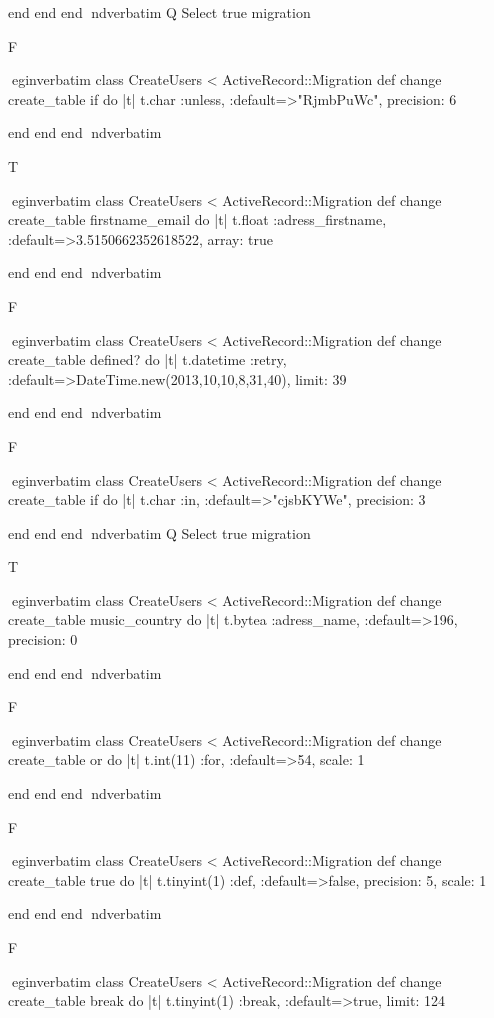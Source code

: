     end 
  end 
end
nd{verbatim}
Q
 Select true migration

F

egin{verbatim}
 class CreateUsers < ActiveRecord::Migration 
  def change 
    create_table if do |t| 
      t.char :unless, :default=>"RjmbPuWc", precision: 6
    
    end 
  end 
end
nd{verbatim}

T

egin{verbatim}
 class CreateUsers < ActiveRecord::Migration 
  def change 
    create_table firstname_email do |t| 
      t.float :adress_firstname, :default=>3.5150662352618522, array: true
    
    end 
  end 
end
nd{verbatim}

F

egin{verbatim}
 class CreateUsers < ActiveRecord::Migration 
  def change 
    create_table defined? do |t| 
      t.datetime :retry, :default=>DateTime.new(2013,10,10,8,31,40), limit: 39
    
    end 
  end 
end
nd{verbatim}

F

egin{verbatim}
 class CreateUsers < ActiveRecord::Migration 
  def change 
    create_table if do |t| 
      t.char :in, :default=>"cjsbKYWe", precision: 3
    
    end 
  end 
end
nd{verbatim}
Q
 Select true migration

T

egin{verbatim}
 class CreateUsers < ActiveRecord::Migration 
  def change 
    create_table music_country do |t| 
      t.bytea :adress_name, :default=>196, precision: 0
    
    end 
  end 
end
nd{verbatim}

F

egin{verbatim}
 class CreateUsers < ActiveRecord::Migration 
  def change 
    create_table or do |t| 
      t.int(11) :for, :default=>54, scale: 1
    
    end 
  end 
end
nd{verbatim}

F

egin{verbatim}
 class CreateUsers < ActiveRecord::Migration 
  def change 
    create_table true do |t| 
      t.tinyint(1) :def, :default=>false, precision: 5, scale: 1
    
    end 
  end 
end
nd{verbatim}

F

egin{verbatim}
 class CreateUsers < ActiveRecord::Migration 
  def change 
    create_table break do |t| 
      t.tinyint(1) :break, :default=>true, limit: 124
    
